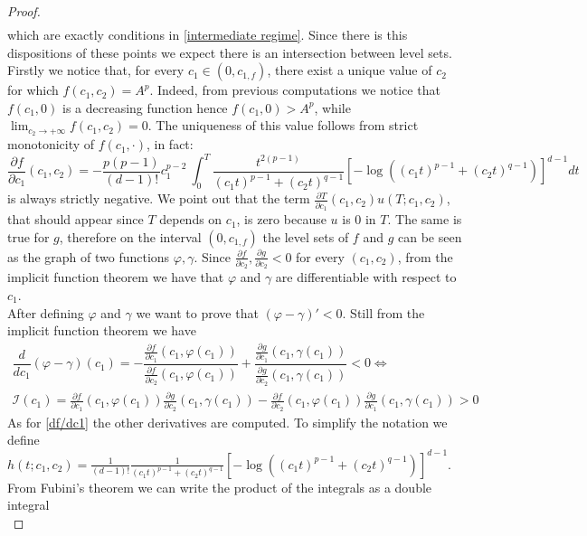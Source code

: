 \documentclass[corpo=11pt, stile=classica, tipotesi=custom,
greek, evenboxes, english]{toptesi}
\numberwithin{equation}{chapter}
\theoremstyle{remark}
\newcommand{\pfrac}[2]{\frac{\partial #1}{\partial #2}}
\begin{document}
\begin{proof}
\begin{align*}
\end{align*}
which are exactly conditions in \eqref{intermediate regime}.
Since there is this dispositions of these points we expect there is an intersection between level sets. Firstly we notice that, for every $c_1 \in (0,c_{1,f})$, there exist a unique value of $c_2$ for which $f(c_1,c_2) = A^p$. Indeed, from previous computations we notice that $f(c_1,0)$ is a decreasing function hence $f(c_1,0) > A^p$, while $\lim_{c_2 \rightarrow +\infty} f(c_1,c_2) = 0$. The uniqueness of this value follows from strict monotonicity of $f(c_1,\cdot)$, in fact:
\begin{equation}\label{df/dc1}
	\pfrac{f}{c_1}(c_1,c_2) = -\dfrac{p(p-1)}{(d-1)!}c_1^{p-2}\ \int_0^T \dfrac{t^{2(p-1)}}{(c_1t)^{p-1}+(c_2t)^{q-1}} \left[ -\log\left((c_1t)^{p-1} + (c_2t)^{q-1}\right) \right]^{d-1}dt
\end{equation}
is always strictly negative. We point out that the term $\frac{\partial T}{\partial c_1}(c_1,c_2)u(T;c_1,c_2)$, that should appear since $T$ depends on $c_1$, is zero because $u$ is 0 in $T$. The same is true for $g$, therefore on the interval $(0,c_{1,f})$ the level sets of $f$ and $g$ can be seen as the graph of two functions $\varphi, \gamma$. Since $\frac{\partial f}{\partial c_2}, \frac{\partial g}{\partial c_2} < 0$ for every $(c_1,c_2)$, from the implicit function theorem we have that $\varphi$ and  $\gamma$ are differentiable with respect to $c_1$.\\
After defining $\varphi$ and $\gamma$ we want to prove that $(\varphi-\gamma)' < 0$. Still from the implicit function theorem we have
\begin{equation*}
	\begin{split}
		\dfrac{d}{d c_1}(\varphi - \gamma)(c_1) = -\dfrac{\pfrac{f}{c_1}(c_1,\varphi(c_1))}{\pfrac{f}{c_2}(c_1,\varphi(c_1))}  + 
		\dfrac{\pfrac{g}{c_1}(c_1,\gamma(c_1))}{\pfrac{g}{c_2}(c_1,\gamma(c_1))} < 0 \iff \\
		\mathcal{I}(c_1) = \pfrac{f}{c_1}(c_1,\varphi(c_1)) \pfrac{g}{c_2}(c_1,\gamma(c_1)) - \pfrac{f}{c_2}(c_1,\varphi(c_1)) \pfrac{g}{c_1}(c_1,\gamma(c_1)) > 0
	\end{split}
\end{equation*}
As for \eqref{df/dc1} the other derivatives are computed. To simplify the notation we define $h(t;c_1,c_2) = \frac{1}{(d-1)!}\frac{1}{(c_1t)^{p-1}+(c_2t)^{q-1}}\left[ -\log\left((c_1t)^{p-1} + (c_2t)^{q-1}\right) \right]^{d-1}$. From Fubini's theorem we can write the product of the integrals as a double integral
\begin{equation*}

\end{equation*}
\end{proof}
\end{document}
